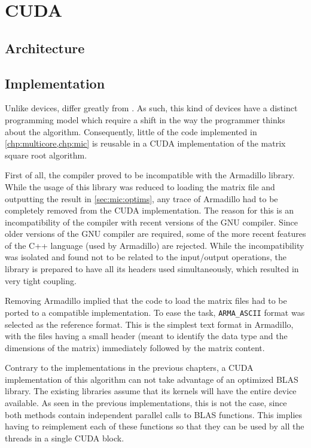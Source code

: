 \documentclass[../thesis]{subfiles}
\begin{document}
	\chapter{CUDA}
	\label{chp:cuda}

	\section{Architecture}
	\section{Implementation}
	Unlike \mic devices, \gpus differ greatly from \cpus. As such, this kind of devices have a distinct programming model which require a shift in the way the programmer thinks about the algorithm. Consequently, little of the code implemented in \cref{chp:multicore,chp:mic} is reusable in a CUDA implementation of the matrix square root algorithm.

	First of all, the \nvidia compiler proved to be incompatible with the Armadillo library. While the usage of this library was reduced to loading the matrix file and outputting the result in \cref{sec:mic:optims}, any trace of Armadillo had to be completely removed from the CUDA implementation. The reason for this is an incompatibility of the \nvidia compiler with recent versions of the GNU compiler. Since older versions of the GNU compiler are required, some of the more recent features of the C++ language (used by Armadillo) are rejected. While the incompatibility was isolated and found not to be related to the input/output operations, the library is prepared to have all its headers used simultaneously, which resulted in very tight coupling.

	Removing Armadillo implied that the code to load the matrix files had to be ported to a compatible implementation. To ease the task, \texttt{ARMA\_ASCII} format was selected as the reference format. This is the simplest text format in Armadillo, with the files having a small header (meant to identify the data type and the dimensions of the matrix) immediately followed by the matrix content.

	Contrary to the implementations in the previous chapters, a CUDA implementation of this algorithm can not take advantage of an optimized BLAS library. The existing libraries assume that its kernels will have the entire device available. As seen in the previous implementations, this is not the case, since both methods contain independent parallel calls to BLAS functions. This implies having to reimplement each of these functions so that they can be used by all the threads in a single CUDA block.
\end{document}
